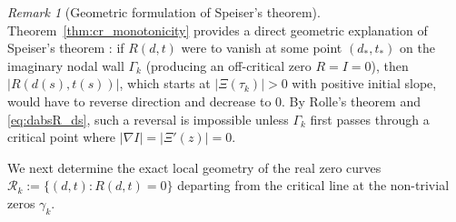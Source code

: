\documentclass[11pt,a4paper,reqno]{amsart}
\theoremstyle{definition}
\theoremstyle{remark}
\newtheorem{remark}[theorem]{Remark}
\numberwithin{equation}{section}
\begin{document}
\begin{remark}[Geometric formulation of Speiser's theorem]\label{rem:speiser_geo}
Theorem~\ref{thm:cr_monotonicity} provides a direct geometric explanation of Speiser's theorem \cite{Speiser1934}: if $R(d,t)$ were to vanish at some point $(d_*, t_*)$ on the imaginary nodal wall $\Gamma_k$ (producing an off-critical zero $R = I = 0$), then $|R(d(s), t(s))|$, which starts at $|\Xi(\tau_k)| > 0$ with positive initial slope, would have to reverse direction and decrease to $0$. By Rolle's theorem and \eqref{eq:dabsR_ds}, such a reversal is impossible unless $\Gamma_k$ first passes through a critical point where $|\nabla I| = |\Xi'(z)| = 0$.
\end{remark}

We next determine the exact local geometry of the real zero curves $\mathcal{R}_k := \{(d,t) : R(d,t) = 0\}$ departing from the critical line at the non-trivial zeros $\gamma_k$.
\end{document}
